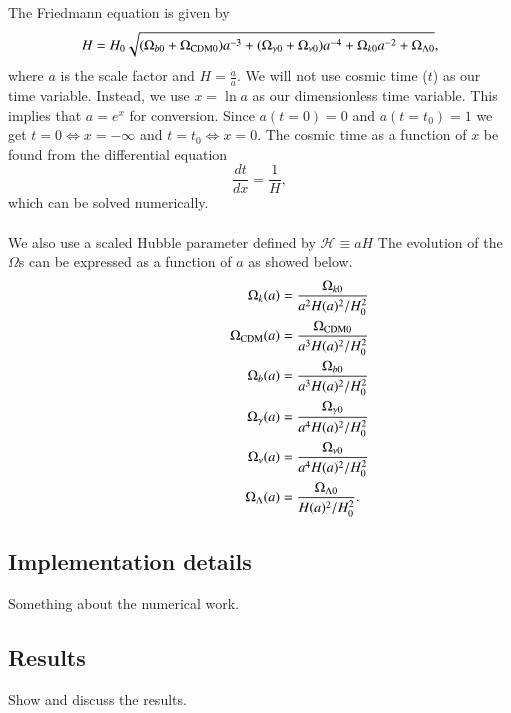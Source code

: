 \documentclass{aa}
\begin{document}
\noindent
The Friedmann equation is given by
\begin{equation}\label{Friedmann}
      H = H_0 \sqrt{(\Omega_{b0}+\Omega_{\rm CDM 0})a^{-3} + (\Omega_{\gamma 0} + \Omega_{\nu 0}) a^{-4} + \Omega_{k 0} a^{-2} + \Omega_{\Lambda 0}},
\end{equation}
where $a$ is the scale factor and  $H = \frac{\dot{a}}{a}$. We will not use cosmic time ($t$) as our time variable.
Instead, we use $x=\ln a$ as our dimensionless time variable. This implies that $a = e^x$ for conversion. Since $a(t=0)=0$ and $a(t=t_0)=1$
we get $t=0 \iff x = -\infty$ and $t=t_0 \iff x = 0$. The cosmic time as a function of $x$ be found from the differential equation 
\begin{equation}\label{cosmic_time_differential_equation}
      \frac{dt}{dx} = \frac{1}{H},
\end{equation}
which can be solved numerically. \\ \\
\noindent
We also use a scaled Hubble parameter defined by $\mathcal{H}\equiv aH$
The evolution of the $\Omega$s can be expressed as a function of $a$ as showed below. 
\begin{equation}
      \hspace*{2cm}
   \begin{aligned}
      \Omega_{k}(a) &= \frac{\Omega_{k0}}{a^2H(a)^2/H_0^2}\\
      \Omega_{\rm CDM}(a) &= \frac{\Omega_{\rm CDM 0}}{a^3H(a)^2/H_0^2} \\
      \Omega_b(a) &= \frac{\Omega_{b 0}}{a^3H(a)^2/H_0^2} \\
      \Omega_\gamma(a) &= \frac{\Omega_{\gamma 0}}{a^4H(a)^2/H_0^2} \\
      \Omega_{\nu}(a) &= \frac{\Omega_{\nu 0}}{a^4H(a)^2/H_0^2} \\
      \Omega_{\Lambda}(a) &= \frac{\Omega_{\Lambda 0}}{H(a)^2/H_0^2}.
   \end{aligned}
\end{equation}


\subsection{Implementation details}
Something about the numerical work.

\subsection{Results}
Show and discuss the results.
\end{document}
